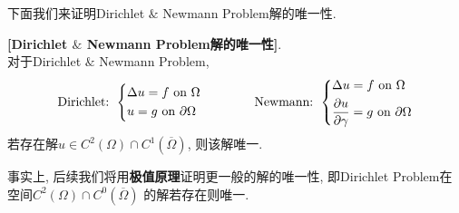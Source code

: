 	\vspace*{4em}
	
	下面我们来证明Dirichlet $\&$ Newmann Problem解的唯一性. 
	
	\newpage
	
	\begin{proposition}\label{prop 3.1.2}
		\textbf{[Dirichlet $\&$ Newmann Problem解的唯一性]}. \\
		对于Dirichlet $\&$ Newmann Problem, 
		\begin{align*}
			\text{Dirichlet: } 
			\begin{dcases*}
				\Delta u = f \,\, \text{on} \,\, \Omega \\
				u = g \,\, \text{on} \,\, \partial \Omega
			\end{dcases*}
			\hspace*{4em}
			\text{Newmann: }
			\begin{dcases*}
				\Delta u = f \,\, \text{on} \,\, \Omega \\
				\frac{\partial u}{\partial \gamma} = g \,\, \text{on} \,\, \partial \Omega
			\end{dcases*}
		\end{align*}
		若存在解$u \in C^2(\Omega) \cap C^1 \left( \overline{\Omega} \right)$, 则该解唯一. 
		
		\vspace*{4em}
		
		\begin{rmk}
			事实上, 后续我们将用\textbf{极值原理}证明更一般的解的唯一性, 即Dirichlet Problem在空间$C^2(\Omega) \cap C^0(\overline{\Omega})$ 的解若存在则唯一. 
		\end{rmk}
		
		\vspace*{4em}
		

\end{proposition}
